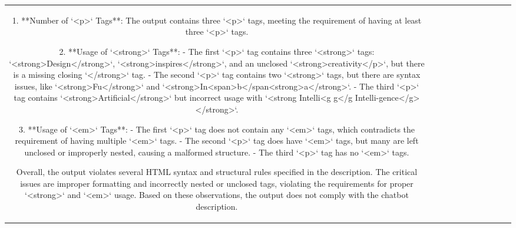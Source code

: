\begin{table}[h!]
\begin{tabular}{|c|c|c|c|c|c|c|c|c|c|c|}
1. **Number of `<p>` Tags**: The output contains three `<p>` tags, meeting the requirement of having at least three `<p>` tags.

2. **Usage of `<strong>` Tags**: 
   - The first `<p>` tag contains three `<strong>` tags: `<strong>Design</strong>`, `<strong>inspires</strong>`, and an unclosed `<strong>creativity</p>`, but there is a missing closing `</strong>` tag.
   - The second `<p>` tag contains two `<strong>` tags, but there are syntax issues, like `<strong>Fu</strong>` and `<strong>In<span>b</span<strong>a</strong>`.
   - The third `<p>` tag contains `<strong>Artificial</strong>` but incorrect usage with `<strong Intelli<g g</g Intelli-gence</g> </strong>`.

3. **Usage of `<em>` Tags**: 
   - The first `<p>` tag does not contain any `<em>` tags, which contradicts the requirement of having multiple `<em>` tags.
   - The second `<p>` tag does have `<em>` tags, but many are left unclosed or improperly nested, causing a malformed structure.
   - The third `<p>` tag has no `<em>` tags.

Overall, the output violates several HTML syntax and structural rules specified in the description. The critical issues are improper formatting and incorrectly nested or unclosed tags, violating the requirements for proper `<strong>` and `<em>` usage. Based on these observations, the output does not comply with the chatbot description.


\end{tabular}
\end{table}
